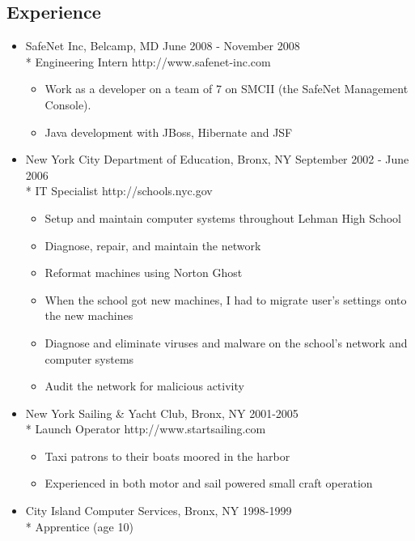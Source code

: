 \documentclass[margins]{res-compat}
\begin{document}
\begin{resume}
\section{Experience}
	\begin{itemize} \itemsep -2pt
		\item SafeNet Inc, Belcamp, MD \hfill June 2008 - November 2008
		\\* Engineering Intern \hfill http://www.safenet-inc.com
		\begin{itemize} \itemsep -2pt
			\item Work as a developer on a team of 7 on SMCII (the SafeNet
			Management Console).
			\item Java development with JBoss, Hibernate and JSF
		\end{itemize}
		\item New York City Department of Education, Bronx, NY \hfill September 2002 - June 2006
		\\* IT Specialist \hfill http://schools.nyc.gov
		\begin{itemize} \itemsep -2pt
			\item Setup and maintain computer systems throughout Lehman High School
			\item Diagnose, repair, and maintain the network
			\item Reformat machines using Norton Ghost
			\item When the school got new machines, I had to migrate user's settings onto the new machines
			\item Diagnose and eliminate viruses and malware on the school's network and computer systems
			\item Audit the network for malicious activity
		\end{itemize}

		\item New York Sailing \& Yacht Club, Bronx, NY \hfill 2001-2005
		\\* Launch Operator \hfill http://www.startsailing.com
		\begin{itemize} \itemsep -2pt
			\item Taxi patrons to their boats moored in the harbor
			\item Experienced in both motor and sail powered small craft operation
		\end{itemize}

		\item City Island Computer Services, Bronx, NY \hfill 1998-1999
		\\* Apprentice (age 10)
	\end{itemize}


\end{resume}
\end{document}

